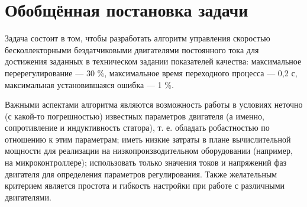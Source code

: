 \chapter{Обобщённая постановка задачи}
\label{cha:chap31}

Задача состоит в том, чтобы разработать алгоритм управления скоростью бесколлекторными бездатчиковыми двигателями постоянного тока для достижения заданных в техническом задании показателей качества: максимальное перерегулирование --- 30 \%, максимальное время переходного процесса --- 0,2 с, максимальная установившаяся ошибка --- 1 \%.	

Важными аспектами алгоритма являются возможность работы в условиях неточно (с какой-то погрешностью) известных параметров двигателя (а именно, сопротивление и индуктивность статора), т. е. обладать робастностью по отношению к этим параметрам; иметь низкие затраты в плане вычислительной мощности для реализации на низкопроизводительном оборудовании (например, на микроконтроллере); использовать только значения токов и напряжений фаз двигателя для определения параметров регулирования. Также желательным критерием является простота и гибкость настройки при работе с различными двигателями.


